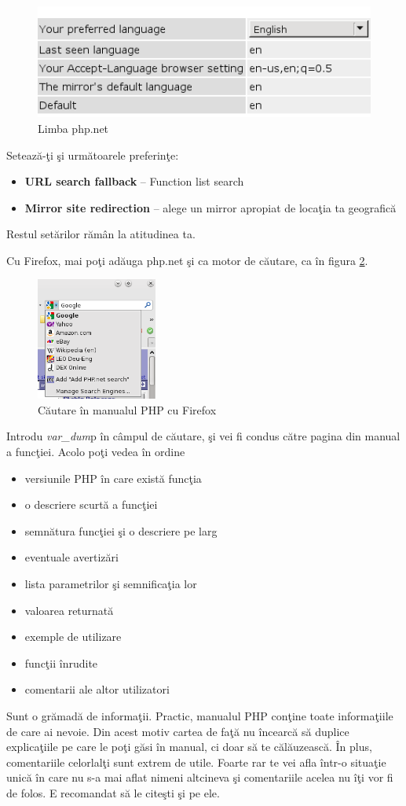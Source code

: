 \begin{figure}[h!]
  \centering
    \includegraphics{cap03/language.png}
  \caption{Limba php.net}
  \label{fig:php.net lang}
\end{figure}
Setează-ţi şi următoarele preferinţe:
\begin{itemize}
\item \textbf{URL search fallback} -- Function list search
\item \textbf{Mirror site redirection} -- alege un mirror apropiat de locaţia ta geografică
\end{itemize}
Restul setărilor rămân la atitudinea ta.

Cu Firefox, mai poţi adăuga php.net şi ca motor de căutare, ca în
figura \ref{fig:php.net search}.

\begin{figure}[h!]
  \centering
    \includegraphics[width=150px]{cap03/search.png}
  \caption{Căutare în manualul PHP cu Firefox}
  \label{fig:php.net search}
\end{figure}

Introdu \textit{var\_dum}p în câmpul de căutare, şi vei fi condus
către pagina din manual a funcţiei. Acolo poţi vedea
în ordine
\begin{itemize}
\item versiunile PHP în care există funcţia
\item o descriere scurtă a funcţiei
\item semnătura funcţiei şi o descriere pe larg
\item eventuale avertizări
\item lista parametrilor şi semnificaţia lor
\item valoarea returnată
\item exemple de utilizare
\item funcţii înrudite
\item comentarii ale altor utilizatori
\end{itemize}
Sunt o grămadă de informaţii. Practic, manualul
PHP conţine toate informaţiile de care ai nevoie.
Din acest motiv cartea de faţă nu încearcă să 
duplice explicaţiile pe care le poţi găsi în manual,
ci doar să te călăuzească. În plus, comentariile
celorlalţi sunt extrem de utile. Foarte rar te vei
afla într-o situaţie unică în care nu s-a mai aflat
nimeni altcineva şi comentariile acelea nu îţi vor fi de 
folos. E recomandat să le citeşti şi pe ele.


